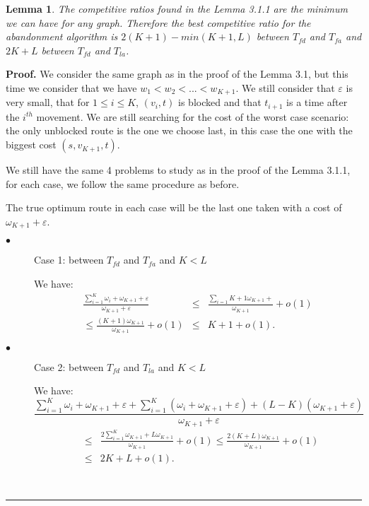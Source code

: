 \documentclass[letter-size, 11pt]{article}
\newtheorem{lemma}{Lemma}
\newenvironment{proof}[1][Proof]{\textbf{#1.} }{\ \rule{0.5em}{0.5em}}
\begin{document}
\begin{lemma} The competitive ratios found in the Lemma 3.1.1 are the minimum we can have for any graph. Therefore the best competitive ratio for the abandonment algorithm is $2(K+1) - min(K+1,L)$ between $T_{fd}$ and $T_{fa}$ and $2K+L$ between $T_{fd}$ and $T_{la}$.
\end{lemma}

\begin{proof} We consider the same graph as in the proof of the Lemma 3.1, but this time we consider that we have $w_1 < w_2 < ... < w_{K+1}$. We still consider that $\varepsilon$ is very small, that for $1\leq i \leq K$, $(v_i,t)$ is blocked and that $t_{i+1}$ is a time after the $i^{th}$ movement. We are still searching for the cost of the worst case scenario: the only unblocked route is the one we choose last, in this case the one with the biggest cost $(s,v_{K+1},t)$.


We still have the same 4 problems to study as in the proof of the Lemma 3.1.1, for each case, we follow the same procedure as before.

The true optimum route in each case will be the last one taken with a cost of $\omega_{K+1} + \varepsilon$.

\begin{description}
\item[$\bullet$] Case 1: between $T_{fd}$ and $T_{fa}$ and $K<L$

We have: 
\begin{eqnarray}
\frac {\sum_{i=1}^{K} \omega_{i} + \omega_{K+1} + \varepsilon} {\omega_{K+1} + \varepsilon} &\leq& \frac {\sum_{i=1}{K+1} \omega_{K+1} +} {\omega_{K+1}} + o(1)  \nonumber \\
\leq \frac {(K+1)\omega_{K+1} } {\omega_{K+1}} + o(1) &\leq& K+1 + o(1).\nonumber
\end{eqnarray}

\item[$\bullet$] Case 2: between $T_{fd}$ and $T_{la}$ and $K<L$

We have:
\[
\frac {\sum_{i=1}^{K} \omega_{i} +  \omega_{K+1} + \varepsilon + \sum_{i=1}^{K}(\omega_{i} + \omega_{K+1} + \varepsilon) + (L - K) ( \omega_{K+1} + \varepsilon )}{\omega_{K+1} + \varepsilon}
\]
\begin{eqnarray}
&\leq& \frac {2\sum_{i=1}^{K} \omega_{K+1} + L\omega_{K+1}}{\omega_{K+1}} + o(1) \leq \frac {2(K+L)\omega_{K+1}}{\omega_{K+1}} + o(1) \nonumber\\
 &\leq& 2K+ L + o(1).\nonumber
\end{eqnarray}


\end{description}
\end{proof}
\end{document}
